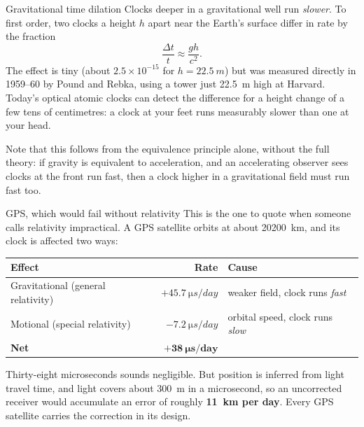 \begin{remarkbox}{Gravitational time dilation}
Clocks deeper in a gravitational well run \emph{slower}. To first order, two clocks a height $h$ apart
near the Earth's surface differ in rate by the fraction
\[
\frac{\Delta t}{t}\approx\frac{gh}{c^{2}} .
\]
The effect is tiny (about $2.5\times10^{-15}$ for $h=\SI{22.5}{m}$) but was measured directly in
1959--60 by Pound and Rebka, using a tower just \SI{22.5}{m} high at Harvard. Today's optical atomic
clocks can detect the difference for a height change of a few tens of centimetres: a clock at your feet
runs measurably slower than one at your head.

\smallskip
Note that this follows from the equivalence principle alone, without the full theory: if gravity is
equivalent to acceleration, and an accelerating observer sees clocks at the front run fast, then a clock
higher in a gravitational field must run fast too.
\end{remarkbox}

\begin{remarkbox}{GPS, which would fail without relativity}
This is the one to quote when someone calls relativity impractical. A GPS satellite orbits at about
\SI{20200}{km}, and its clock is affected two ways:
\begin{center}
\begin{tabular}{@{}lrl@{}}
\toprule
Effect & Rate & Cause\\
\midrule
Gravitational (general relativity) & $+\SI{45.7}{\micro s/day}$ & weaker field, clock runs \emph{fast}\\
Motional (special relativity)      & $-\SI{7.2}{\micro s/day}$  & orbital speed, clock runs \emph{slow}\\
\midrule
\textbf{Net}                       & $\mathbf{+\SI{38}{\micro s/day}}$ & \\
\bottomrule
\end{tabular}
\end{center}
Thirty-eight microseconds sounds negligible. But position is inferred from light travel time, and light
covers about \SI{300}{m} in a microsecond, so an uncorrected receiver would accumulate an error of
roughly \textbf{\SI{11}{km} per day}. Every GPS satellite carries the correction in its design.
\end{remarkbox}

